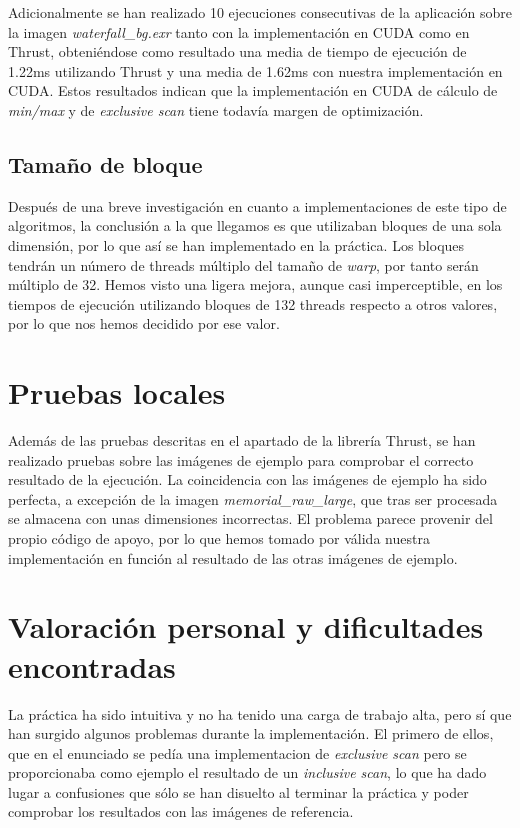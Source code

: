 \documentclass[10pt,oneside,a4paper]{article}
\begin{document}
Adicionalmente se han realizado 10 ejecuciones consecutivas de la aplicación sobre la imagen \textit{waterfall\_bg.exr} tanto con la implementación en CUDA como en Thrust, obteniéndose como resultado una media de tiempo de ejecución de 1.22ms utilizando Thrust y una media de 1.62ms con nuestra implementación en CUDA. Estos resultados indican que la implementación en CUDA de cálculo de \emph{min/max} y de \emph{exclusive scan} tiene todavía margen de optimización.

\subsection{Tamaño de bloque}
Después de una breve investigación en cuanto a implementaciones de este tipo de algoritmos, la conclusión a la que llegamos es que utilizaban bloques de una sola dimensión, por lo que así se han implementado en la práctica. Los bloques tendrán un número de threads múltiplo del tamaño de \textit{warp}, por tanto serán múltiplo de 32. Hemos visto una ligera mejora, aunque casi imperceptible, en los tiempos de ejecución utilizando bloques de 132 threads respecto a otros valores, por lo que nos hemos decidido por ese valor.

\section{Pruebas locales}
Además de las pruebas descritas en el apartado de la librería Thrust, se han realizado pruebas sobre las imágenes de ejemplo para comprobar el correcto resultado de la ejecución. La coincidencia con las imágenes de ejemplo ha sido perfecta, a excepción de la imagen \textit{memorial\_raw\_large}, que tras ser procesada se almacena con unas dimensiones incorrectas. El problema parece provenir del propio código de apoyo, por lo que hemos tomado por válida nuestra implementación en función al resultado de las otras imágenes de ejemplo.

\section{Valoración personal y dificultades encontradas}
La práctica ha sido intuitiva y no ha tenido una carga de trabajo alta, pero sí que han surgido algunos problemas durante la implementación. El primero de ellos, que en el enunciado se pedía una implementacion de \emph{exclusive scan} pero se proporcionaba como ejemplo el resultado de un \emph{inclusive scan}, lo que ha dado lugar a confusiones que sólo se han disuelto al terminar la práctica y poder comprobar los resultados con las imágenes de referencia.\\
\end{document}

